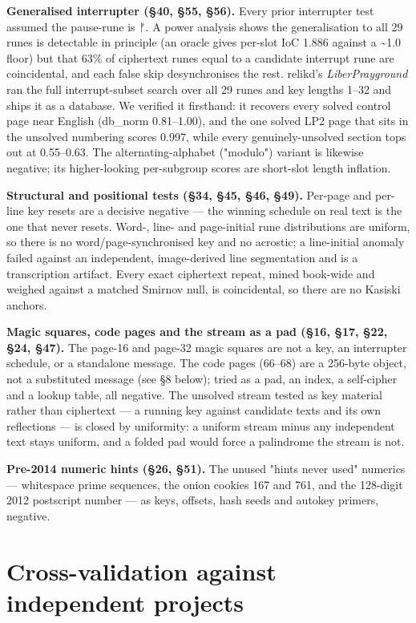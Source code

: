\documentclass[11pt]{article}
\begin{document}
\textbf{Generalised interrupter (§40, §55, §56).} Every prior interrupter test assumed the pause-rune is ᚠ. A power analysis shows the generalisation to all 29 runes is detectable in principle (an oracle gives per-slot IoC 1.886 against a \textasciitilde{}1.0 floor) but that 63\% of ciphertext runes equal to a candidate interrupt rune are coincidental, and each false skip desynchronises the rest. relikd's \emph{LiberPrayground} ran the full interrupt-subset search over all 29 runes and key lengths 1–32 and ships it as a database. We verified it firsthand: it recovers every solved control page near English (db\_norm 0.81–1.00), and the one solved LP2 page that sits in the unsolved numbering scores 0.997, while every genuinely-unsolved section tops out at 0.55–0.63. The alternating-alphabet ("modulo") variant is likewise negative; its higher-looking per-subgroup scores are short-slot length inflation.


\textbf{Structural and positional tests (§34, §45, §46, §49).} Per-page and per-line key resets are a decisive negative — the winning schedule on real text is the one that never resets. Word-, line- and page-initial rune distributions are uniform, so there is no word/page-synchronised key and no acrostic; a line-initial anomaly failed against an independent, image-derived line segmentation and is a transcription artifact. Every exact ciphertext repeat, mined book-wide and weighed against a matched Smirnov null, is coincidental, so there are no Kasiski anchors.


\textbf{Magic squares, code pages and the stream as a pad (§16, §17, §22, §24, §47).} The page-16 and page-32 magic squares are not a key, an interrupter schedule, or a standalone message. The code pages (66–68) are a 256-byte object, not a substituted message (see §8 below); tried as a pad, an index, a self-cipher and a lookup table, all negative. The unsolved stream tested as key material rather than ciphertext — a running key against candidate texts and its own reflections — is closed by uniformity: a uniform stream minus any independent text stays uniform, and a folded pad would force a palindrome the stream is not.


\textbf{Pre-2014 numeric hints (§26, §51).} The unused "hints never used" numerics — whitespace prime sequences, the onion cookies 167 and 761, and the 128-digit 2012 postscript number — as keys, offsets, hash seeds and autokey primers, negative.


\section{Cross-validation against independent projects}
\end{document}
